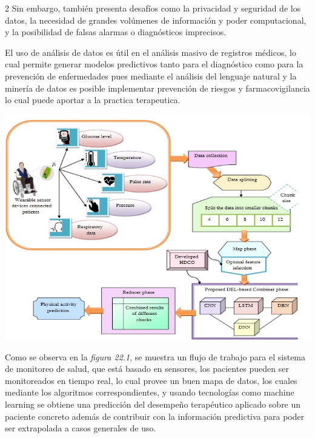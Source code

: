\documentclass[12pt,spanish,Letterpaper,openany]{book}
\begin{document}
\begin {multicols}{2}
Sin embargo, también presenta desafíos como la privacidad y seguridad de los datos, la necesidad de grandes volúmenes de información y poder computacional, y la posibilidad de falsas alarmas o diagnósticos imprecisos.

El uso de análisis de datos es útil en el análisis masivo de registros médicos, lo cual permite generar modelos predictivos tanto para el diagnóstico como para la prevención de enfermedades pues mediante el análisis del lenguaje natural y la minería de datos es posible implementar prevención de riesgos y farmacovigilancia lo cual puede aportar a la practica terapeutica.

\begin {flushleft}
\noindent\begin{minipage}[c]{\columnwidth}

\begin{center}\includegraphics[width=1\linewidth]{imagenes_articulos/sp40_01} \end{center}

\end{minipage}
\end {flushleft}

Como se observa en la \emph{figura 22.1}, se muestra un flujo de trabajo para el sistema de monitoreo de salud, que está basado en sensores, los pacientes pueden ser monitoreados en tiempo real, lo cual provee un buen mapa de datos, los cuales mediante los algoritmos correspondientes, y usando tecnologías como machine learning se obtiene una predicción del desempeño terapéutico aplicado sobre un paciente concreto además de contribuir con la información predictiva para poder ser extrapolada a casos generales de uso.


\end{multicols}
\end{document}
